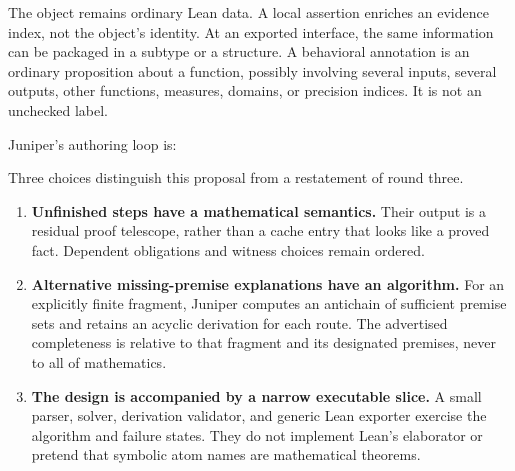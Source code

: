 \documentclass[11pt,a4paper]{article}
\theoremstyle{definition}\newtheorem{definition}[theorem]{Definition}
\theoremstyle{remark}\newtheorem{remark}[theorem]{Remark}
\begin{document}
The object remains ordinary Lean data. A local assertion enriches an evidence index, not the object's identity. At an exported interface, the same information can be packaged in a subtype or a structure. A behavioral annotation is an ordinary proposition about a function, possibly involving several inputs, several outputs, other functions, measures, domains, or precision indices. It is not an unchecked label.

Juniper's authoring loop is:
\begin{center}
\end{center}

Three choices distinguish this proposal from a restatement of round three.
\begin{enumerate}
\item \textbf{Unfinished steps have a mathematical semantics.} Their output is a residual proof telescope, rather than a cache entry that looks like a proved fact. Dependent obligations and witness choices remain ordered.
\item \textbf{Alternative missing-premise explanations have an algorithm.} For an explicitly finite fragment, Juniper computes an antichain of sufficient premise sets and retains an acyclic derivation for each route. The advertised completeness is relative to that fragment and its designated premises, never to all of mathematics.
\item \textbf{The design is accompanied by a narrow executable slice.} A small parser, solver, derivation validator, and generic Lean exporter exercise the algorithm and failure states. They do not implement Lean's elaborator or pretend that symbolic atom names are mathematical theorems.
\end{enumerate}
\end{document}
